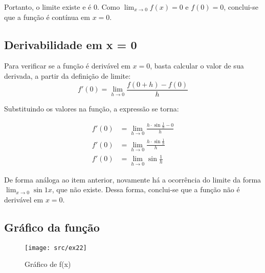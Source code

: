 Portanto, o limite existe e é 0. Como $\lim_{x\to0}f(x) = 0$ e $f(0) = 0$, conclui-se que a função
é contínua em $x = 0$.

\subsection{Derivabilidade em x = 0}

Para verificar se a função é derivável em $x = 0$, basta calcular o valor de sua derivada, a partir
da definição de limite:
\[f'(0) = \lim_{h\to0} \frac{f(0 + h) - f(0)}{h}\]

Substituindo os valores na função, a expressão se torna:

\begin{align*}
    f'(0) &= \lim_{h\to0} \frac{h\cdot\sin{\frac{1}{h}} - 0}{h} \\
    f'(0) &= \lim_{h\to0} \frac{h\cdot\sin{\frac{1}{h}}}{h} \\
    f'(0) &= \lim_{h\to0}\sin{\frac{1}{h}}
\end{align*}

De forma análoga ao item anterior, novamente há a ocorrência do limite da forma $\lim_{x\to0} \sin{1}{x}$,
que não existe. Dessa forma, conclui-se que a função não é derivável em $x = 0$.

\subsection{Gráfico da função}

\begin{figure}[H]
    \centering
    \texttt{[image: src/ex22]}
    \caption{Gráfico de f(x)}
\end{figure}

